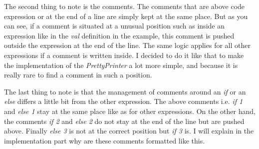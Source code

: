 The second thing to note is the comments. The comments that are above code expression or at the end of a line are simply kept at the same place. But as you can see, if a comment is situated at a unusual position such as inside an expression like in the \emph{val} definition in the example, this comment is pushed outside the expression at the end of the line. The same logic applies for all other expressions if a comment is written inside. I decided to do it like that to make the implementation of the \emph{PrettyPrinter} a lot more simple, and because it is really rare to find a comment in such a position. 

The last thing to note is that the management of comments around an \emph{if} or an \emph{else} differs a little bit from the other expression. The above comments i.e. \emph{if 1} and \emph{else 1} stay at the same place like as for other expressions. On the other hand, the comments \emph{if 2} and \emph{else 2} do not stay at the end of the line but are pushed above. Finally \emph{else 3} is not at the correct position but \emph{if 3} is. I will explain in the implementation part why are these comments formatted like this.



